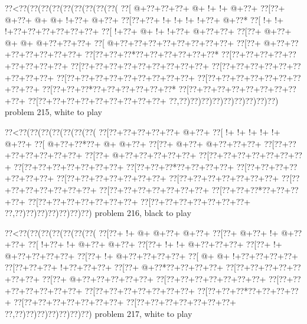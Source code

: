 \vbox{\vbox{\goo
\0??<\0??(\0??(\0??(\0??(\0??(\0??(\0??(\0??(\0??(
\0??[\- @+\0??+\0??+\0??+\- @+\- !+\- !+\- @+\0??+
\0??[\0??+\- @+\0??+\- @+\- @+\- !+\0??+\- @+\0??+
\0??[\0??+\0??+\- !+\- !+\- !+\- !+\0??+\- @+\0??*
\0??[\- !+\- !+\- !+\0??+\0??+\0??+\0??+\0??+\0??+
\0??[\- !+\0??+\- @+\- !+\- !+\0??+\- @+\0??+\0??+
\0??[\0??+\- @+\0??+\- @+\- @+\- @+\0??+\0??+\0??+
\0??[\- @+\0??+\0??+\0??+\0??+\0??+\0??+\0??+\0??+
\0??[\0??+\- @+\0??+\0??+\0??+\0??+\0??+\0??+\0??+
\0??[\0??+\0??+\0??*\0??+\0??+\0??+\0??+\0??+\0??*
\0??[\0??+\0??+\0??+\0??+\0??+\0??+\0??+\0??+\0??+
\0??[\0??+\0??+\0??+\0??+\0??+\0??+\0??+\0??+\0??+
\0??[\0??+\0??+\0??+\0??+\0??+\0??+\0??+\0??+\0??+
\0??[\0??+\0??+\0??+\0??+\0??+\0??+\0??+\0??+\0??+
\0??[\0??+\0??+\0??+\0??+\0??+\0??+\0??+\0??+\0??+
\0??[\0??+\0??+\0??*\0??+\0??+\0??+\0??+\0??+\0??*
\0??[\0??+\0??+\0??+\0??+\0??+\0??+\0??+\0??+\0??+
\0??[\0??+\0??+\0??+\0??+\0??+\0??+\0??+\0??+\0??+
\0??,\0??)\0??)\0??)\0??)\0??)\0??)\0??)\0??)\0??)
}
\hfil problem 215, white to play\hfil\break
}

\vbox{\vbox{\goo
\0??<\0??(\0??(\0??(\0??(\0??(\0??(\0??(
\0??[\0??+\0??+\0??+\0??+\0??+\- @+\0??+
\0??[\- !+\- !+\- !+\- !+\- !+\- @+\0??+
\0??[\- @+\0??+\0??*\0??+\- @+\- @+\0??+
\0??[\0??+\- @+\0??+\- @+\0??+\0??+\0??+
\0??[\0??+\0??+\0??+\0??+\0??+\0??+\0??+
\0??[\0??+\- @+\0??+\0??+\0??+\0??+\0??+
\0??[\0??+\0??+\0??+\0??+\0??+\0??+\0??+
\0??[\0??+\0??+\0??+\0??+\0??+\0??+\0??+
\0??[\0??+\0??+\0??*\0??+\0??+\0??+\0??+
\0??[\0??+\0??+\0??+\0??+\0??+\0??+\0??+
\0??[\0??+\0??+\0??+\0??+\0??+\0??+\0??+
\0??[\0??+\0??+\0??+\0??+\0??+\0??+\0??+
\0??[\0??+\0??+\0??+\0??+\0??+\0??+\0??+
\0??[\0??+\0??+\0??+\0??+\0??+\0??+\0??+
\0??[\0??+\0??+\0??*\0??+\0??+\0??+\0??+
\0??[\0??+\0??+\0??+\0??+\0??+\0??+\0??+
\0??[\0??+\0??+\0??+\0??+\0??+\0??+\0??+
\0??,\0??)\0??)\0??)\0??)\0??)\0??)\0??)
}
\hfil problem 216, black to play\hfil\break
}

\vbox{\vbox{\goo
\0??<\0??(\0??(\0??(\0??(\0??(\0??(\0??(
\0??[\0??+\- !+\- @+\- @+\0??+\- @+\0??+
\0??[\0??+\- @+\0??+\- !+\- @+\0??+\0??+
\0??[\- !+\0??+\- !+\- @+\0??+\- @+\0??+
\0??[\0??+\- !+\- !+\- @+\0??+\0??+\0??+
\0??[\0??+\- !+\- @+\0??+\0??+\0??+\0??+
\0??[\0??+\- !+\- @+\0??+\0??+\0??+\0??+
\0??[\- @+\- @+\- !+\0??+\0??+\0??+\0??+
\0??[\0??+\0??+\0??+\- !+\0??+\0??+\0??+
\0??[\0??+\- @+\0??*\0??+\0??+\0??+\0??+
\0??[\0??+\0??+\0??+\0??+\0??+\0??+\0??+
\0??[\0??+\- @+\0??+\0??+\0??+\0??+\0??+
\0??[\0??+\0??+\0??+\0??+\0??+\0??+\0??+
\0??[\0??+\0??+\0??+\0??+\0??+\0??+\0??+
\0??[\0??+\0??+\0??+\0??+\0??+\0??+\0??+
\0??[\0??+\0??+\0??*\0??+\0??+\0??+\0??+
\0??[\0??+\0??+\0??+\0??+\0??+\0??+\0??+
\0??[\0??+\0??+\0??+\0??+\0??+\0??+\0??+
\0??,\0??)\0??)\0??)\0??)\0??)\0??)\0??)
}
\hfil problem 217, white to play\hfil\break
}

